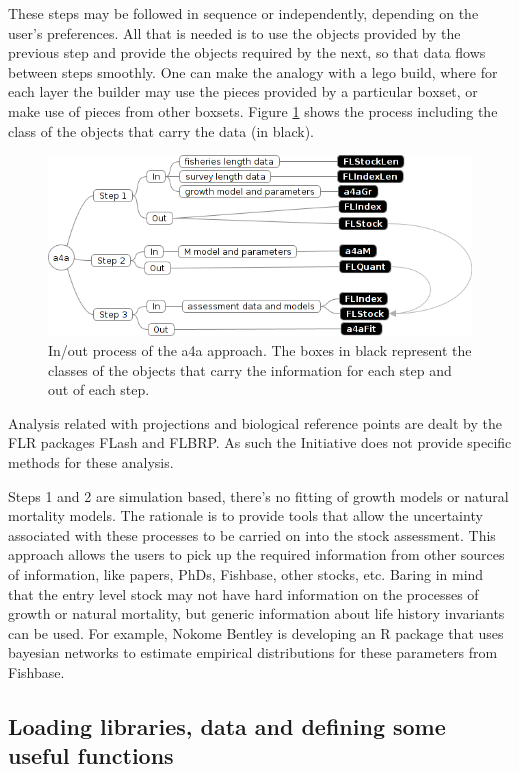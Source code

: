\documentclass[a4paper,english,10pt]{article}\usepackage[]{graphicx}\usepackage[]{color}
\begin{document}
These steps may be followed in sequence or independently, depending on the user's preferences. All that is needed is to use the objects provided by the previous step and provide the objects required by the next, so that data flows between steps smoothly. One can make the analogy with a lego build, where for each layer the builder may use the pieces provided by a particular boxset, or make use of pieces from other boxsets. Figure \ref{fig:inout} shows the process including the class of the objects that carry the data (in black).

\begin{figure}[h]
\centering
\includegraphics[width=\textwidth]{./inout}
\caption{In/out process of the a4a approach. The boxes in black represent the classes of the objects that carry the information for each step and out of each step.}
\label{fig:inout}
\end{figure}

Analysis related with projections and biological reference points are dealt by the FLR packages FLash and FLBRP. As such the Initiative does not provide specific methods for these analysis.

Steps 1 and 2 are simulation based, there's no fitting of growth models or natural mortality models. The rationale is to provide tools that allow the uncertainty associated with these processes to be carried on into the stock assessment. This approach allows the users to pick up the required information from other sources of information, like papers, PhDs, Fishbase, other stocks, etc. Baring in mind that the entry level stock may not have hard information on the processes of growth or natural mortality, but generic information about life history invariants can be used. For example, Nokome Bentley is developing an R package that uses bayesian networks to estimate empirical distributions for these parameters from Fishbase.

\subsection{Loading libraries, data and defining some useful functions}
\end{document}
